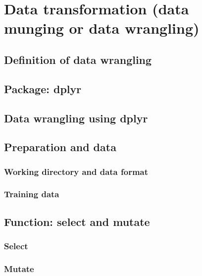 \documentclass[]{book}
\theoremstyle{definition}
\theoremstyle{definition}
\theoremstyle{definition}
\theoremstyle{remark}
\begin{document}
\chapter{Data transformation (data munging or data
wrangling)}\label{data-transformation-data-munging-or-data-wrangling}

\section{Definition of data
wrangling}\label{definition-of-data-wrangling}

\section{Package: dplyr}\label{package-dplyr}

\section{Data wrangling using dplyr}\label{data-wrangling-using-dplyr}

\section{Preparation and data}\label{preparation-and-data}

\subsection{Working directory and data
format}\label{working-directory-and-data-format}

\subsection{Training data}\label{training-data-2}

\section{Function: select and mutate}\label{function-select-and-mutate}

\subsection{Select}\label{select}

\subsection{Mutate}\label{mutate}
\end{document}
